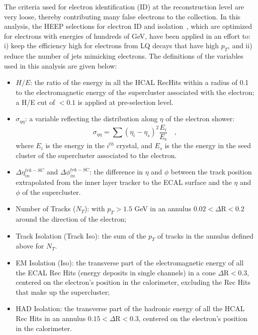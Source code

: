 The criteria used for electron identification (ID) at the reconstruction level are very loose, thereby contributing many false electrons 
to the collection. In this analysis, the HEEP selections for electron ID and isolation~\cite{HEEPNOTE}, which are optimized for 
electrons with energies of hundreds of GeV, have been applied in an effort to: i) keep the efficiency high for electrons 
from LQ decays that have high $p_{T}$, and ii) reduce the number of jets mimicking electrons.
The definitions of the variables used in this analysis are given below:
%
\begin{itemize}
%
\item $H/E$: the ratio of the energy in all the HCAL RecHits within a radius of 0.1 to the electromagnetic energy of 
the supercluster associated with the electron; a H/E cut of $<0.1$ is applied at pre-selection level.
%
\item $\sigma_{\eta\eta}$: a variable reflecting the distribution along $\eta$ of the electron shower:
\begin{displaymath}
\sigma_{\eta\eta} = \sum( \eta_i - \eta_s )^2 \frac{E_i}{E_{\mbox{s}}} \quad ,
\end{displaymath}
where $E_i$ is the energy in the $i^{th}$ crystal, and $E_s$ is the the energy in the seed cluster of the supercluster associated to the electron.
%
\item $\Delta\eta_{in}^{trk-SC}$ and $\Delta\phi_{in}^{trk-SC}$: the difference in $\eta$ and $\phi$ between the track position extrapolated from 
the inner layer tracker to the ECAL surface and the $\eta$ and $\phi$ of the supercluster.
%
\item Number of Tracks ($N_T$): with $p_{T}>1.5$ GeV in an annulus $0.02 < \Delta\mbox{R} < 0.2 $ around the direction of the electron;
%
\item Track Isolation (Track Iso): the sum of the $p_{T}$ of tracks in the annulus defined above for $N_T$.
%
%
\item EM Isolation (Iso): the transverse part of the electromagnetic energy 
of all the ECAL Rec Hits (energy deposits in single channels)
in a cone $\Delta\mbox{R} < 0.3$, 
centered on the electron's position in the calorimeter, excluding the Rec Hits that make up the supercluster;
%
\item HAD Isolation: the transverse part of the hadronic energy of all the HCAL Rec Hits in an annulus
$0.15 < \Delta\mbox{R} < 0.3$, centered on the electron's position in the calorimeter. 
%
\end{itemize}

